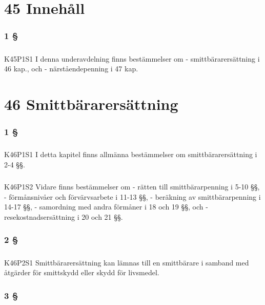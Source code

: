 \documentclass[a4paper,notitlepage,openany,10pt]{book}
\begin{document}
\chapter*{45 Innehåll}
\subsection*{1 §}
\paragraph*{}
{\tiny K45P1S1}
I denna underavdelning finns bestämmelser om
\newline - smittbärarersättning i 46 kap., och - närståendepenning i 47 kap.
\chapter*{46 Smittbärarersättning}
\subsection*{1 §}
\paragraph*{}
{\tiny K46P1S1}
I detta kapitel finns allmänna bestämmelser om smittbärarersättning i 2-4 §§.
\paragraph*{}
{\tiny K46P1S2}
Vidare finns bestämmelser om - rätten till smittbärarpenning i 5-10 §§,
\newline - förmånsnivåer och förvärvsarbete i 11-13 §§, - beräkning av smittbärarpenning i 14-17 §§,
\newline - samordning med andra förmåner i 18 och 19 §§, och
\newline - resekostnadsersättning i 20 och 21 §§.
\subsection*{2 §}
\paragraph*{}
{\tiny K46P2S1}
Smittbärarersättning kan lämnas till en smittbärare i samband med åtgärder för smittskydd eller skydd för livsmedel.
\subsection*{3 §}
\end{document}
